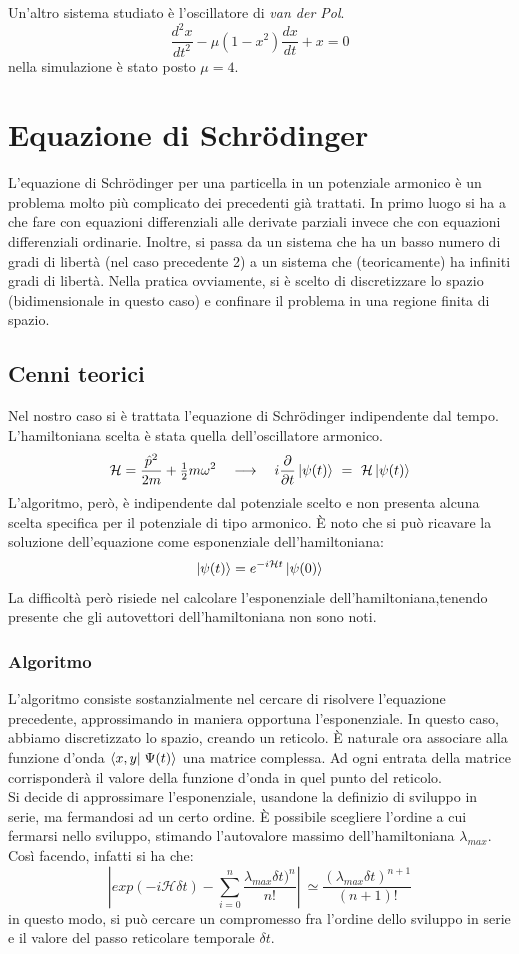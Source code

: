Un'altro sistema studiato è l'oscillatore di \emph{van der Pol}.
$$
\frac{d^2x}{dt^2}-\mu(1-x^2)\frac{dx}{dt}+x = 0
$$
nella simulazione è stato posto $\mu = 4$.
\pagebreak
\section{Equazione di Schr\"{o}dinger}
L'equazione di Schr\"{o}dinger per una particella in un potenziale armonico è un problema molto più complicato dei precedenti già trattati.
In primo luogo si ha a che fare con equazioni differenziali alle derivate parziali invece che con equazioni differenziali ordinarie.
Inoltre, si passa da un sistema che ha un basso numero di gradi di libertà (nel caso precedente 2) a un sistema che (teoricamente) ha infiniti gradi di libertà.
Nella pratica ovviamente, si è scelto di discretizzare lo spazio (bidimensionale in questo caso) e confinare il problema in una regione finita di spazio.
\subsection{Cenni teorici}
Nel nostro caso si è trattata l'equazione di Schr\"odinger indipendente dal tempo. L'hamiltoniana scelta è stata quella dell'oscillatore armonico.
$$
\mathcal{H} = \frac{\hat{p}^2}{2m} + \tfrac{1}{2}m \omega^2 \quad \longrightarrow \quad i \frac{ \partial }{ \partial t}\left| \psi(t) \right> \ = \ \mathcal{H} \left| \psi(t) \right>
$$
L'algoritmo, però, è indipendente dal potenziale scelto e non presenta alcuna scelta specifica per il potenziale di tipo armonico.
È noto che si può ricavare la soluzione dell'equazione come esponenziale dell'hamiltoniana:
$$
\left| \psi(t) \right> = e^{ -i \mathcal{H} t} \left| \psi(0) \right>
$$
La difficoltà però risiede nel calcolare l'esponenziale dell'hamiltoniana,tenendo presente che gli autovettori dell'hamiltoniana non sono noti.
\subsubsection{Algoritmo}
L'algoritmo consiste sostanzialmente nel cercare di risolvere l'equazione precedente, approssimando in maniera opportuna l'esponenziale.
In questo caso, abbiamo discretizzato lo spazio, creando un reticolo. È naturale ora associare alla funzione d'onda $ \braket{x,y}{\Psi(t)}$ una
matrice complessa. Ad ogni entrata della matrice corrisponderà il valore della funzione d'onda in quel punto del reticolo.\\
Si decide di approssimare l'esponenziale, usandone la definizio di sviluppo in serie, ma fermandosi ad un certo ordine. È possibile scegliere l'ordine a cui fermarsi nello sviluppo,
stimando l'autovalore massimo dell'hamiltoniana $ \lambda_{max}$. Così facendo, infatti si ha che:
$$
\left| exp \left( - i \mathcal{H} \delta t \right) - \sum_{i=0}^n \frac{\lambda_{max} \delta t)^{n}}{n!} \right| \ \simeq \frac{\left(\lambda_{max} \delta t\right)^{n+1}}{(n+1)!} 
$$
in questo modo, si può cercare un compromesso fra l'ordine dello sviluppo in serie e il valore del passo reticolare temporale $\delta t$.
